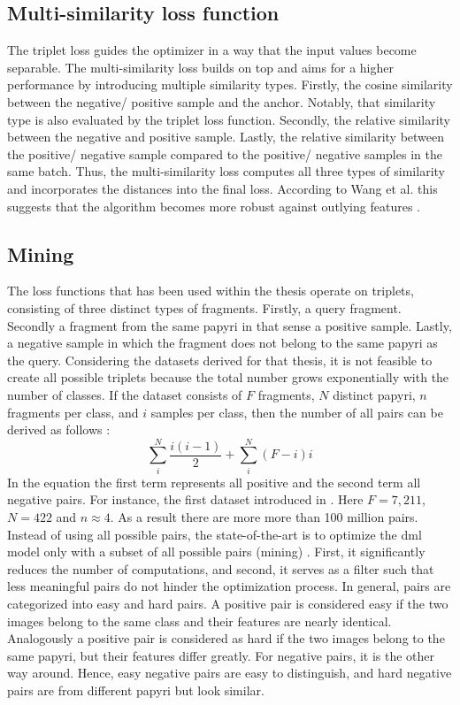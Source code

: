 \subsection{Multi-similarity loss function}
The triplet loss guides the optimizer in a way that the input values become separable. The multi-similarity loss builds on top and aims for a higher performance by introducing multiple similarity types. Firstly, the cosine similarity between the negative/ positive sample and the anchor. Notably, that similarity type is also evaluated by the triplet loss function. Secondly, the relative similarity between the negative and positive sample. Lastly, the relative similarity between the positive/ negative sample compared to the positive/ negative samples in the same batch. Thus, the multi-similarity loss computes all three types of similarity and incorporates the distances into the final loss. According to Wang et al. this suggests that the algorithm becomes more robust against outlying features \cite{wang19}.  
%
\subsection{Mining}
The loss functions that has been used within the thesis operate on triplets, consisting of three distinct types of fragments. Firstly, a query fragment. Secondly a fragment from the same papyri in that sense a positive sample. Lastly, a negative sample in which the fragment does not belong to the same papyri as the query. Considering the datasets derived for that thesis, it is not feasible to create all possible triplets because the total number grows exponentially with the number of classes. If the  dataset consists of \(F\) fragments, \(N\) distinct papyri, \(n\) fragments per class, and \(i\) samples per class, then the number of all pairs can be derived as follows \cite{Schroff15}:
\begin{equation}
	\label{equ:pairs}
	\sum_{i}^{N} \frac{i(i-1)}{2} + \sum_{i}^{N} (F-i)i
\end{equation}
In the equation the first term represents all positive and the second term all negative pairs. For instance, the first dataset introduced in . Here \(F=7,211 \), \(N=422\) and \(n\approx4\). As a result there are more more than 100 million pairs.\\ 

\noindent Instead of using all possible pairs, the state-of-the-art is to optimize the \ac{dml} model only with a subset of all possible pairs (mining) \cite{Schroff15}. First, it significantly reduces the number of computations, and second, it serves as a filter such that less meaningful pairs do not hinder the optimization process. In general, pairs are categorized into easy and hard pairs. A positive pair is considered easy if the two images belong to the same class and their features are nearly identical. Analogously a positive pair is considered as hard if the two images belong to the same papyri, but their features differ greatly. For negative pairs, it is the other way around. Hence, easy negative pairs are easy to distinguish, and hard negative pairs are from different papyri but look similar.\\

